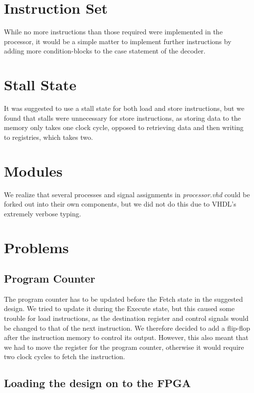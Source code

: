 \section{Instruction Set}

While no more instructions than those required were implemented in the processor, it would be a simple matter to implement further instructions by adding more condition-blocks to the case statement of the decoder.

\section{Stall State}

It was suggested to use a stall state for both load and store instructions, but we found that stalls were unnecessary for store instructions, as storing data to the memory only takes one clock cycle, opposed to retrieving data and then writing to registries, which takes two.

\section{Modules}

We realize that several processes and signal assignments in \emph{processor.vhd} could be forked out into their own components, but we did not do this due to VHDL's extremely verbose typing.

\section{Problems}

\subsection{Program Counter}

The program counter has to be updated before the Fetch state in the suggested design. We tried to update it during the Execute state, but this caused some trouble for load instructions, as the destination register and control signals would be changed to that of the next instruction. We therefore decided to add a flip-flop after the instruction memory to control its output. However, this also meant that we had to move the register for the program counter, otherwise it would require two clock cycles to fetch the instruction.

\subsection{Loading the design on to the FPGA}
\label{subsec:uploadproblems}

